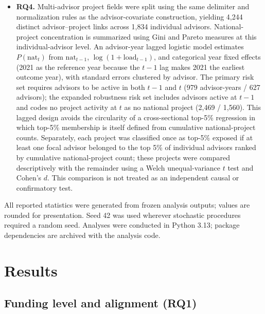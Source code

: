 \documentclass[11pt]{article}
\begin{document}
\begin{itemize}
\item \textbf{RQ4.} Multi-advisor project fields were split using the same delimiter and normalization rules as the advisor-covariate construction, yielding 4,244 distinct advisor--project links across 1,834 individual advisors. National-project concentration is summarized using Gini and Pareto measures at this individual-advisor level. An advisor-year lagged logistic model estimates $P(\mathrm{nat}_t)$ from $\mathrm{nat}_{t-1}$, $\log(1+\mathrm{load}_{t-1})$, and categorical year fixed effects (2021 as the reference year because the $t-1$ lag makes 2021 the earliest outcome year), with standard errors clustered by advisor. The primary risk set requires advisors to be active in both $t-1$ and $t$ (979 advisor-years / 627 advisors); the expanded robustness risk set includes advisors active at $t-1$ and codes no project activity at $t$ as no national project (2,469 / 1,560). This lagged design avoids the circularity of a cross-sectional top-5\% regression in which top-5\% membership is itself defined from cumulative national-project counts. Separately, each project was classified once as top-5\% exposed if at least one focal advisor belonged to the top 5\% of individual advisors ranked by cumulative national-project count; these projects were compared descriptively with the remainder using a Welch unequal-variance $t$ test and Cohen's $d$. This comparison is not treated as an independent causal or confirmatory test.
\end{itemize}

All reported statistics were generated from frozen analysis outputs; values are rounded for presentation. Seed 42 was used wherever stochastic procedures required a random seed. Analyses were conducted in Python 3.13; package dependencies are archived with the analysis code.

\section{Results}

\subsection{Funding level and alignment (RQ1)}
\end{document}
